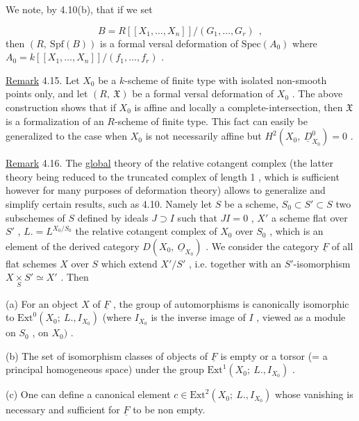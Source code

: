 We note, by 4.10(b), that if we set

\begin{equation*}
B = R[[X_1,\ldots,X_n]]/(G_1,\ldots,G_r)\ \ ,
\end{equation*}
then  $(R,\ \mathrm{Spf}(B))$  is a formal versal deformation of  $\mathrm{Spec}(A_0)$  where  $A_0 = k[[X_1,\ldots,X_n]]/(f_1,\ldots,f_r)$  .

\underline{Remark} 4.15.  Let  $X_0$  be a $k$-scheme of finite type with isolated non-smooth points only, and let  $(R,\ \mathfrak{X})$  be a formal versal deformation of  $X_0$  . The above construction shows that if  $X_0$  is affine and locally a complete-intersection, then  $\mathfrak{X}$  is a formalization of an $R$-scheme of finite type. This fact can easily be generalized to the case when  $X_0$  is not necessarily affine but  $H^2(X_0,\ \underline{D}^0_{X_0}) = 0$  .

\underline{Remark} 4.16.  The \underline{global}  theory of the relative cotangent complex (the latter theory being reduced to the truncated complex of length 1 , which is sufficient however for many purposes of deformation theory) allows to generalize and simplify certain results, such as 4.10. Namely let  $S$  be a scheme,  $S_0 \subset S' \subset S$  two subschemes of  $S$  defined by ideals  $J \supset I$  such that  $JI = 0$  ,  $X'$  a scheme flat over  $S'$  ,  $L. = L^{X_0/S_0}$  the relative cotangent complex of  $X_0$  over  $S_0$  , which is an element of the derived category  $D(X_0,\ \underline{O}_{X_0})$  . We consider the category  $\underline{F}$  of all flat schemes  $X$  over  $S$  which extend  $X'/S'$  , i.e. together with an  $S'$-isomorphism  $X \underset{S}{\times} S' \simeq X'$  . Then

(a)  For an object  $X$  of  $\underline{F}$  , the group of automorphisms is canonically isomorphic to  $\mathrm{Ext}^0(X_0;\ L.,I_{X_0})$  (where  $I_{X_0}$  is the inverse image of  $I$  , viewed as a module on  $S_0$  , on  $X_0)$  .



(b)  The set of isomorphism classes of objects of  $\underline{F}$  is empty or a torsor (= a principal homogeneous space) under the group  $\mathrm{Ext}^1(X_0;\ L.,I_{X_0})$  .

(c)  One can define a canonical element  $c \in \mathrm{Ext}^2(X_0;\ L.,I_{X_0})$  whose vanishing is necessary and sufficient for  $\underline{F}$  to be non empty.

